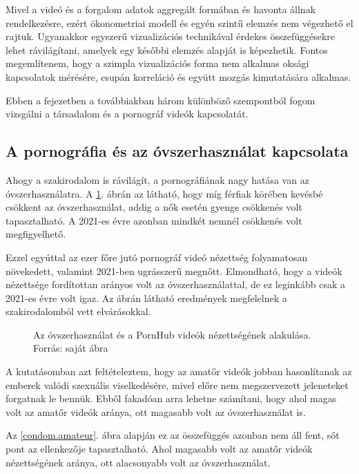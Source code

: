\documentclass[12pt,a4paper]{article}
\begin{document}
Mivel a videó és a forgalom adatok aggregált formában és havonta állnak rendelkezésre, ezért ökonometriai modell és egyén szintű elemzés nem végezhető el rajtuk. Ugyanakkor egyszerű vizualizációs technikával érdekes összefüggésekre lehet rávilágítani, amelyek egy későbbi elemzés alapját is képezhetik. Fontos megemlítenem, hogy a szimpla vizualizációs forma nem alkalmas oksági kapcsolatok mérésére, csupán korreláció és együtt mozgás kimutatására alkalmas. 

Ebben a fejezetben a továbbiakban három különböző szempontból fogom vizsgálni a társadalom és a pornográf videók kapcsolatát.

\subsection{A pornográfia és az óvszerhasználat kapcsolata}

Ahogy a szakirodalom is rávilágít, a pornográfiának nagy hatása van az óvszerhasználatra. A \ref{condom.view}. ábrán az látható, hogy míg férfiak körében kevésbé csökkent az óvszerhasználat, addig a nők esetén gyenge csökkenés volt tapasztalható. A 2021-es évre azonban mindkét nemnél csökkenés volt megfigyelhető.

Ezzel egyúttal az ezer főre jutó pornográf videó nézettség folyamatosan növekedett, valamint 2021-ben ugrásszerű megnőtt. Elmondható, hogy a videók nézettsége fordítottan arányos volt az óvszerhasználattal, de ez leginkább csak a 2021-es évre volt igaz. Az ábrán látható eredmények megfelelnek a szakirodalomból vett elvárásokkal.

\begin{figure}[h]
    \caption[Nézettség és óvszerhasználat]{\footnotesize{Az óvszerhasználat és a PornHub videók nézettségének alakulása. Forrás: saját ábra}}
    \label{condom.view}
    \begin{center}
        
    \end{center}
\end{figure}

A kutatásomban azt feltételeztem, hogy az amatőr videók jobban hasonlítanak az emberek valódi szexuális viselkedésére, mivel előre nem megszervezett jeleneteket forgatnak le bennük. Ebből fakadóan arra lehetne számítani, hogy ahol magas volt az amatőr videók aránya, ott magasabb volt az óvszerhasználat is.

Az \ref{condom.amateur}. ábra alapján ez az összefüggés azonban nem áll fent, sőt pont az ellenkezője tapasztalható. Ahol magasabb volt az amatőr videók nézettségének aránya, ott alacsonyabb volt az óvszerhasználat. 
\end{document}

